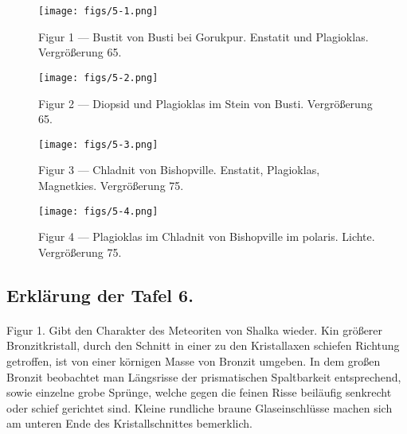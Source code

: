 \documentclass[a4paper, 12pt, oneside]{article}
\begin{document}
\vspace*{\fill}
\begin{figure}[H]
\centering
\texttt{[image: figs/5-1.png]}
\caption{\small Figur 1 --- Bustit von Busti bei Gorukpur. Enstatit und Plagioklas. Vergrößerung 65.}
\end{figure}
\vspace*{\fill}
\clearpage

\vspace*{\fill}
\begin{figure}[H]
\centering
\texttt{[image: figs/5-2.png]}
\caption{\small Figur 2 --- Diopsid und Plagioklas im Stein von Busti. Vergrößerung 65.}
\end{figure}
\vspace*{\fill}
\clearpage

\vspace*{\fill}
\begin{figure}[H]
\centering
\texttt{[image: figs/5-3.png]}
\caption{\small Figur 3 --- Chladnit von Bishopville. Enstatit, Plagioklas, Magnetkies. Vergrößerung 75.}
\end{figure}
\vspace*{\fill}
\clearpage

\vspace*{\fill}
\begin{figure}[H]
\centering
\texttt{[image: figs/5-4.png]}
\caption{\small Figur 4 --- Plagioklas im Chladnit von Bishopville im polaris. Lichte. Vergrößerung 75.}
\end{figure}
\vspace*{\fill}
\clearpage

\subsection{Erklärung der Tafel 6.}
\paragraph{}
Figur 1. Gibt den Charakter des Meteoriten von Shalka wieder. Kin größerer Bronzitkristall, durch den Schnitt in einer zu den Kristallaxen schiefen Richtung getroffen, ist von einer körnigen Masse von Bronzit umgeben. In dem großen Bronzit beobachtet man Längsrisse der prismatischen Spaltbarkeit entsprechend, sowie einzelne grobe Sprünge, welche gegen die feinen Risse beiläufig senkrecht oder schief gerichtet sind. Kleine rundliche braune Glaseinschlüsse machen sich am unteren Ende des Kristallschnittes bemerklich.
\end{document}
